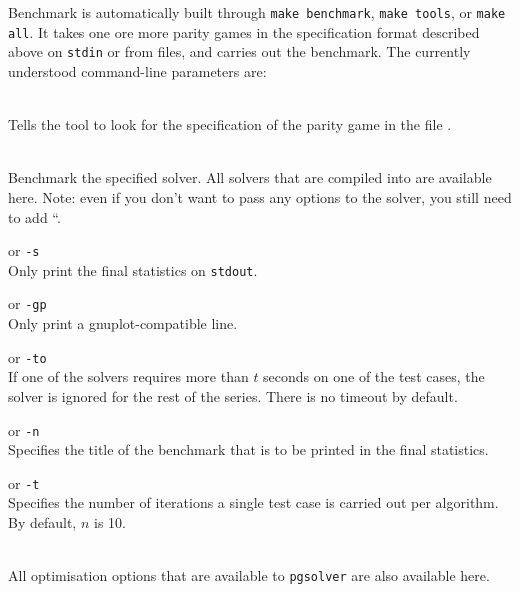 Benchmark is automatically built through \verb#make benchmark#, \verb#make tools#, or \verb#make all#.
It takes one ore more parity games in the specification format described above on \texttt{stdin} or
from files, and carries out the benchmark. The currently understood command-line parameters are:

\begin{description}
\itemsep3mm
\item[\nonterminal{filename}] \ \\
   Tells the tool to look for the specification of the parity game in the file
   .

\item[{\tt --\nonterminal{solver} `solver options`}] \ \\
   Benchmark the specified solver. All solvers that are compiled into \pgsolver are available here. Note: even if you don't want to pass any options to the solver, you still need to add ``.

\item[{\tt --silent}] \enspace or {\tt -s} \\
   Only print the final statistics on \texttt{stdout}.

\item[{\tt --gnuplotformat}] \enspace or {\tt -gp} \\
   Only print a gnuplot-compatible line.

 \item[{\tt --timeout \nonterminal{timeout}}] \enspace or {\tt -to } \\
   If one of the solvers requires more than $t$ seconds on one of the test cases, the solver is ignored
   for the rest of the series. There is no timeout by default.

\item[{\tt --name \nonterminal{title}}] \enspace or {\tt -n } \\
   Specifies the title of the benchmark that is to be printed in the final statistics.

 \item[{\tt --times \nonterminal{n}}] \enspace or {\tt -t } \\
   Specifies the number of iterations a single test case is carried out per algorithm. By default, $n$
   is 10.

\item[{\tt --\nonterminal{optimisation-option}}] \ \\
   All optimisation options that are available to \texttt{pgsolver} are also available here.
\end{description}



